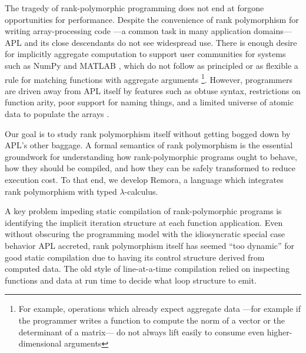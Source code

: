The tragedy of rank-polymorphic programming
does not end at forgone opportunities for performance.
Despite the convenience of rank polymorphism
for writing array-processing code%
---a common task in many application domains---%
APL and its close descendants do not see widespread use.
There is enough desire for implicitly aggregate computation
to support user communities for systems such as
NumPy \cite{Numpy} and MATLAB \cite{MATLAB},
which do not follow as principled or as flexible a rule
for matching functions with aggregate arguments%
\footnote{For example, operations which already expect aggregate data%
---for example if the programmer writes a function
to compute the norm of a vector or the determinant of a matrix---%
do not always lift easily to consume even higher-dimensional arguments}.
However, programmers are driven away from APL itself by features such as
obtuse syntax,
restrictions on function arity,
poor support for naming things,
and a limited universe of atomic data to populate the arrays \cite{WhatsWrong}.


Our goal is to study rank polymorphism itself
without getting bogged down by APL's other baggage.
A formal semantics of rank polymorphism
is the essential groundwork for understanding
how rank-polymorphic programs ought to behave,
how they should be compiled,
and how they can be safely transformed to reduce execution cost.
To that end, we develop Remora,
a language which integrates rank polymorphism with typed $\lambda$-calculus.

A key problem impeding static compilation of rank-polymorphic programs
is identifying the implicit iteration structure at each function application.
Even without obscuring the programming model
with the idiosyncratic special case behavior APL accreted,
rank polymorphism itself has seemed ``too dynamic'' for good static compilation
due to having its control structure derived from computed data.
The old style of line-at-a-time compilation
relied on inspecting functions and data at run time
to decide what loop structure to emit.

